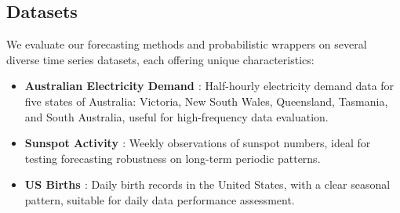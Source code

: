 \subsection{Datasets} \label{datasets}
We evaluate our forecasting methods and probabilistic wrappers on several diverse time series datasets, each offering unique characteristics:

\begin{itemize}
    \item \textbf{Australian Electricity Demand \citep{Godahewa2021Australian}}: Half-hourly electricity demand data for five states of Australia: Victoria, New South Wales, Queensland, Tasmania, and South Australia, useful for high-frequency data evaluation.
    \item \textbf{Sunspot Activity \citep{Godahewa2021Sunspot}}: Weekly observations of sunspot numbers, ideal for testing forecasting robustness on long-term periodic patterns.
    \item \textbf{US Births \citep{Godahewa2021USBirth}}: Daily birth records in the United States, with a clear seasonal pattern, suitable for daily data performance assessment.
\end{itemize}



